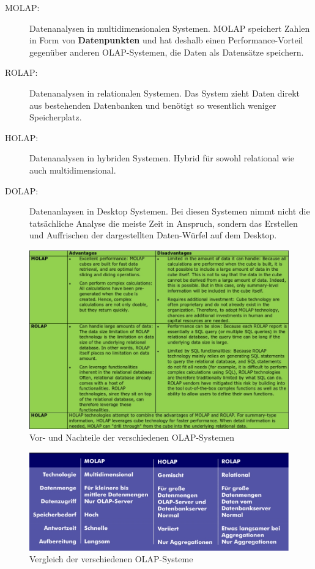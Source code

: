 \documentclass[a4paper, 11pt, nofootinbib]{article}
\begin{document}
\begin{description}
	\item[MOLAP:] Datenanalysen in multidimensionalen Systemen. MOLAP speichert Zahlen in Form von \textbf{Datenpunkten} und hat deshalb einen Performance-Vorteil gegenüber anderen OLAP-Systemen, die Daten als Datensätze speichern.
	\item[ROLAP: ] Datenanalysen in relationalen Systemen. Das System zieht Daten direkt aus bestehenden Datenbanken und benötigt so wesentlich weniger Speicherplatz.
	\item[HOLAP: ] Datenanalysen in hybriden Systemen. Hybrid für sowohl relational wie auch multidimensional.
	\item[DOLAP: ] Datenanlaysen in Desktop Systemen. Bei diesen Systemen nimmt nicht die tatsächliche Analyse die meiste Zeit in Anspruch, sondern das Erstellen und Auffrischen der dargestellten Daten-Würfel auf dem Desktop.
\end{description}

\begin{figure}[htb]
	\centering
	\includegraphics[keepaspectratio=true,height=21\baselineskip]{OLAP}
	\caption{Vor- und Nachteile der verschiedenen OLAP-Systemen}
	\label{fig:OLAP}
\end{figure}

\begin{figure}[htb]
	\centering
	\includegraphics[keepaspectratio=true,height=11\baselineskip]{comp_OLAP.jpg}
	\caption{Vergleich der verschiedenen OLAP-Systeme}
	\label{fig:comp_OLAP}
\end{figure}
\end{document}
